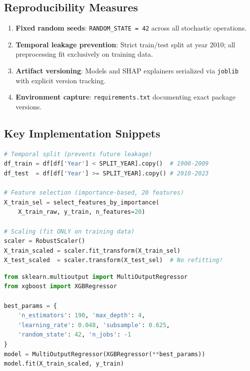 \documentclass[conference]{IEEEtran}
\begin{document}
\subsection{Reproducibility Measures}

\begin{enumerate}
    \item \textbf{Fixed random seeds}: \texttt{RANDOM\_STATE = 42} across all
    stochastic operations.
    \item \textbf{Temporal leakage prevention}: Strict train/test split at year
    2010; all preprocessing fit exclusively on training data.
    \item \textbf{Artifact versioning}: Models and SHAP explainers serialized
    via \texttt{joblib} with explicit version tracking.
    \item \textbf{Environment capture}: \texttt{requirements.txt} documenting
    exact package versions.
\end{enumerate}

\subsection{Key Implementation Snippets}

\begin{lstlisting}[language=Python, caption={Temporal split and scaling
                   pipeline.}, label=lst:preprocessing]
# Temporal split (prevents future leakage)
df_train = df[df['Year'] < SPLIT_YEAR].copy()  # 1900-2009
df_test  = df[df['Year'] >= SPLIT_YEAR].copy() # 2010-2023

# Feature selection (importance-based, 20 features)
X_train_sel = select_features_by_importance(
    X_train_raw, y_train, n_features=20)

# Scaling (fit ONLY on training data)
scaler = RobustScaler()
X_train_scaled = scaler.fit_transform(X_train_sel)
X_test_scaled  = scaler.transform(X_test_sel)  # No refitting!
\end{lstlisting}

\begin{lstlisting}[language=Python, caption={Multi-target model training with
                   optimized XGBoost.}, label=lst:training]
from sklearn.multioutput import MultiOutputRegressor
from xgboost import XGBRegressor

best_params = {
    'n_estimators': 190, 'max_depth': 4,
    'learning_rate': 0.048, 'subsample': 0.625,
    'random_state': 42, 'n_jobs': -1
}
model = MultiOutputRegressor(XGBRegressor(**best_params))
model.fit(X_train_scaled, y_train)
\end{lstlisting}
\end{document}
